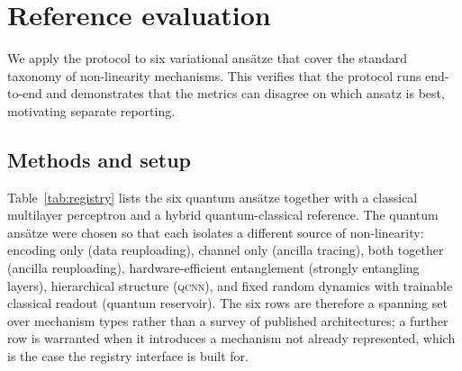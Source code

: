 \documentclass{article}
\begin{document}
\section{Reference evaluation}
\label{sec:results}

We apply the protocol to six variational ans\"atze that cover the standard taxonomy of non-linearity mechanisms. This verifies that the protocol runs end-to-end and demonstrates that the metrics can disagree on which ansatz is best, motivating separate reporting.

\subsection{Methods and setup}
\label{sec:methods}

Table~\ref{tab:registry} lists the six quantum ans\"atze together with a classical multilayer perceptron and a hybrid quantum-classical reference.
The quantum ans\"atze were chosen so that each isolates a different source of non-linearity: encoding only (data reuploading), channel only (ancilla tracing), both together (ancilla reuploading), hardware-efficient entanglement (strongly entangling layers), hierarchical structure (\textsc{qcnn}), and fixed random dynamics with trainable classical readout (quantum reservoir).
The six rows are therefore a spanning set over mechanism types rather than a survey of published architectures; a further row is warranted when it introduces a mechanism not already represented, which is the case the registry interface is built for.
\end{document}
